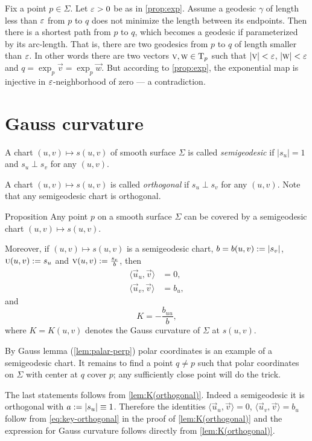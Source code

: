 Fix a point $p\in\Sigma$.
Let $\varepsilon>0$ be as in \ref{prop:exp}.
Assume a geodesic $\gamma$ of length less than $\varepsilon$ from $p$ to $q$ does not minimize the length between its endpoints.
Then there is a shortest path from $p$ to $q$, which becomes a geodesic if parameterized by its arc-length.
That is, there are two geodesics from $p$ to $q$ of length smaller than $\varepsilon$.
In other words there are two vectors ${\textsc v},\textsc w\in\mathrm{T}_p$ such that $|{\textsc v}|<\varepsilon$, $|\textsc w|<\varepsilon$ and 
$q=\exp_p\vec v=\exp_p\vec w$.
But according to \ref{prop:exp}, the exponential map is injective in $\varepsilon$-neighborhood of zero --- a contradiction.\qeds

\section{Gauss curvature}

A chart $(u,v)\mapsto s(u,v)$ of smooth surface $\Sigma$ is called \emph{semigeodesic} if $|s_u|=1$ and $s_u\perp s_v$ for any $(u,v)$.

A chart $(u,v)\mapsto s(u,v)$ is called \emph{orthogonal} if $s_u\perp s_v$ for any $(u,v)$.
Note that any semigeodesic chart is orthogonal.

\begin{thm}{Proposition}\label{prop:K(semigeodesic)}
Any point $p$ on a smooth surface $\Sigma$ can be covered by a semigeodesic chart $(u,v)\mapsto s(u,v)$.

Moreover, if $(u,v)\mapsto s(u,v)$ is a semigeodesic chart, 
$b=b(u,v):=|s_v|$,
$\textsc u(u,v):= s_u$
and 
$\textsc v(u,v):=\tfrac{s_v}b$,
then 
\begin{align*}
\langle\vec u_u,\vec v\rangle&=0,
\\
\langle\vec u_v,\vec v\rangle&=b_u,
\end{align*}
and 
\[K=-\frac{b_{uu}}b,\]
where $K=K(u,v)$ denotes the Gauss curvature of $\Sigma$ at $s(u,v)$.

\end{thm}

By Gauss lemma (\ref{lem:palar-perp}) polar coordinates is an example of a semigeodesic chart.
It remains to find a point $q\ne p$ such that polar coordinates on $\Sigma$ with center at $q$ cover $p$;
any sufficiently close point will do the trick. %

The last statements follows from \ref{lem:K(orthogonal)}.
Indeed a semigeodesic it is orthogonal with $a:=|s_u|\equiv1$.
Therefore the identities $\langle\vec u_u,\vec v\rangle=0$,
$\langle\vec u_v,\vec v\rangle=b_u$ follow from \ref{eq:key-orthogonal} in the proof of \ref{lem:K(orthogonal)}
and the expression for Gauss curvature follows directly from \ref{lem:K(orthogonal)}.
\qeds

